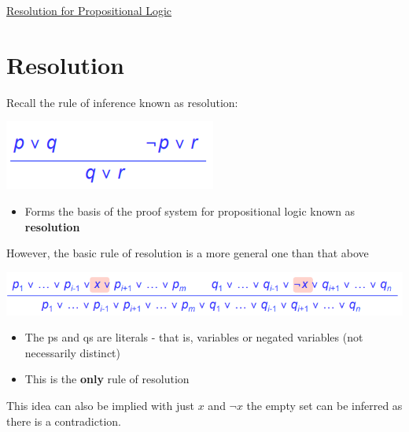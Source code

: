 \documentclass{article}[18pt]
\begin{document}
\begin{center}
\underline{\huge Resolution for Propositional Logic}
\end{center}
\section{Resolution}
Recall the rule of inference known as resolution:
\begin{center}
	\includegraphics[scale=0.7]{resolution}
\end{center}
\begin{itemize}
	\item Forms the basis of the proof system for propositional logic known as \textbf{resolution}
\end{itemize}
However, the basic rule of resolution is a more general one than that above
\begin{center}
	\includegraphics[scale=0.7]{basic_resolution}
\end{center}
\begin{itemize}
	\item The ps and qs are literals - that is, variables or negated variables (not necessarily distinct)
	\item This is the \textbf{only} rule of resolution
\end{itemize}
This idea can also be implied with just $x$ and $\lnot x$ the empty set can be inferred as there is a contradiction.
\end{document}
